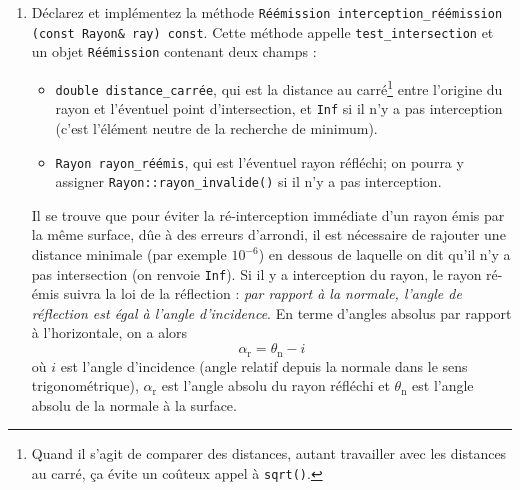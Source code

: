 \documentclass{book}
\newcommand{\inline}[1]{\texttt{#1}}
\begin{document}
\begin{enumerate}
  \item Déclarez et implémentez la méthode \inline{Réémission interception_réémission (const Rayon& ray) const}. Cette méthode appelle \inline{test_intersection} et un objet \inline{Réémission} contenant deux champs :
  \begin{itemize}
    \item \inline{double distance_carrée}, qui est la distance au carré\footnote{Quand il s'agit de comparer des distances, autant travailler avec les distances au carré, ça évite un coûteux appel à \inline{sqrt()}.} entre l'origine du rayon et l'éventuel point d'intersection, et \inline{Inf} si il n'y a pas interception (c'est l'élément neutre de la recherche de minimum).
    \item \inline{Rayon rayon_réémis}, qui est l'éventuel rayon réfléchi; on pourra y assigner \inline{Rayon::rayon_invalide()} si il n'y a pas interception.
  \end{itemize}
  Il se trouve que pour éviter la ré-interception immédiate d'un rayon émis par la même surface, dûe à des erreurs d'arrondi, il est nécessaire de rajouter une distance minimale (par exemple $10^{-6}$) en dessous de laquelle on dit qu'il n'y a pas intersection (on renvoie \inline{Inf}).
  Si il y a interception du rayon, le rayon ré-émis suivra la loi de la réflection : \emph{par rapport à la normale, l'angle de réflection est égal à l'angle d'incidence}. En terme d'angles absolus par rapport à l'horizontale, on a alors $$\alpha_\text{r} = \theta_\text{n} - i$$ où $i$ est l'angle d'incidence (angle relatif depuis la normale dans le sens trigonométrique), $\alpha_\text{r}$ est l'angle absolu du rayon réfléchi et $\theta_\text{n}$ est l'angle absolu de la normale à la surface.

\end{enumerate}
\end{document}
